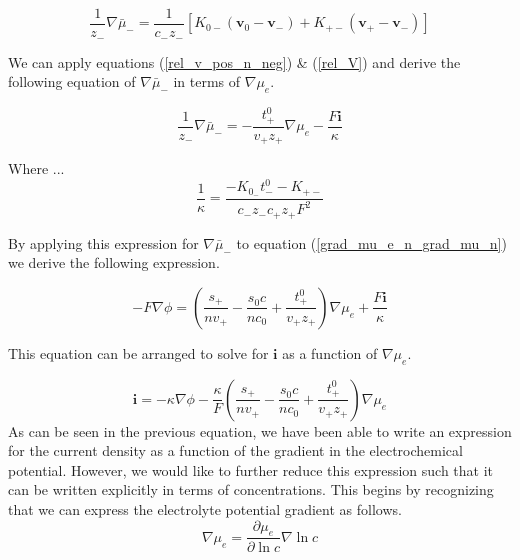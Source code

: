 \documentclass[lettersize,journal]{IEEEtran}
\begin{document}
\begin{equation}
\frac{1}{z_{-}} \nabla \bar{\mu}_{-} =\frac{1}{c_{-} z_{-}}\left[K_{0-}\left(\mathbf{v}_{0}-\mathbf{v}_{-}\right)+K_{+-}\left(\mathbf{v}_{+}-\mathbf{v}_{-}\right)\right]
\end{equation}

\noindent We can apply equations (\ref{rel_v_pos_n_neg}) \& (\ref{rel_V}) and derive the following equation of $\nabla \bar{\mu}_{-}$ in terms of $\nabla \mu_e$.

\begin{equation}
\frac{1}{z_{-}} \nabla \bar{\mu}_{-} =-\frac{t_{+}^{0}}{v_{+} z_{+}} \nabla \mu_{e}-\frac{F \mathbf{i}}{\kappa}
\end{equation}


\noindent Where ...
\begin{equation}
\frac{1}{\kappa}=\frac{-K_{0_{-}} t_{-}^{0}-K_{+-}}{c_{-} z_{-} c_{+} z_{+} F^{2}}
\end{equation}

\noindent By applying this expression for $\nabla \bar{\mu}_{-}$ to equation (\ref{grad_mu_e_n_grad_mu_n}) we derive the following expression.


\begin{equation}
-F \nabla \phi =\left(\frac{s_{+}}{n v_{+}}-\frac{s_{0} c}{n c_{0}}+\frac{t_{+}^{0}}{v_{+} z_{+}}\right) \nabla \mu_{e}+\frac{F \mathbf{i}}{\kappa}
\end{equation}

\noindent This equation can be arranged to solve for $\mathbf{i}$ as a function of $\nabla \mu_e$.


\begin{equation}\label{current_density_mu_e}
  \mathbf{i} =-\kappa \nabla \phi-\frac{\kappa}{F}\left(\frac{s_{+}}{n v_{+}}-\frac{s_{0} c}{n c_{0}}+\frac{t_{+}^{0}}{v_{+} z_{+}}\right) \nabla \mu_{e}
\end{equation}
\noindent As can be seen in the previous equation, we have been able to write an expression for the current density as a function of the gradient in the electrochemical potential. However, we would like to further reduce this expression such that it can be written explicitly in terms of concentrations. This begins by recognizing that we can express the electrolyte potential gradient as follows.
\begin{equation}\label{partial_concentration}
\nabla \mu_{e}=\frac{\partial \mu_{e}}{\partial \ln c} \nabla \ln c
\end{equation}
\end{document}

